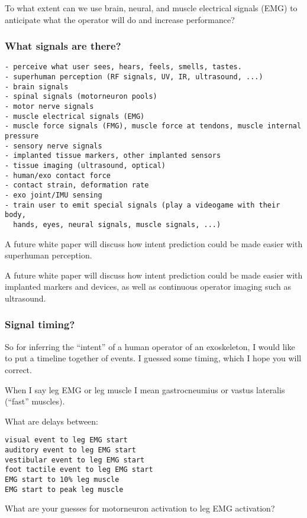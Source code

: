 \documentclass[letterpaper,12pt,fullpage]{article}
\begin{document}
To what extent can we use brain, neural, and muscle electrical signals
(EMG) to anticipate what the operator will do and increase performance?

\subsubsection{What signals are there?}

\begin{verbatim}
- perceive what user sees, hears, feels, smells, tastes.
- superhuman perception (RF signals, UV, IR, ultrasound, ...)
- brain signals
- spinal signals (motorneuron pools)
- motor nerve signals
- muscle electrical signals (EMG)
- muscle force signals (FMG), muscle force at tendons, muscle internal pressure
- sensory nerve signals
- implanted tissue markers, other implanted sensors
- tissue imaging (ultrasound, optical)
- human/exo contact force
- contact strain, deformation rate
- exo joint/IMU sensing
- train user to emit special signals (play a videogame with their body,
  hands, eyes, neural signals, muscle signals, ...)
\end{verbatim}

A future white paper will discuss how intent prediction could be 
made easier with superhuman perception.

A future white paper will discuss how intent prediction could be 
made easier with implanted markers and devices, as well as continuous
operator imaging such as ultrasound.

\subsubsection{Signal timing?}

So for inferring the ``intent'' of a human operator of an
exoskeleton,
I would like to put a timeline together of events.
I guessed some timing, which I hope you will correct.

When I say leg EMG or leg muscle I mean
gastrocneumius or vastus lateralis (``fast'' muscles).

What are delays between:
\begin{verbatim}
visual event to leg EMG start
auditory event to leg EMG start
vestibular event to leg EMG start
foot tactile event to leg EMG start
EMG start to 10% leg muscle
EMG start to peak leg muscle
\end{verbatim}

What are your guesses for motorneuron activation to leg EMG activation?
\end{document}
